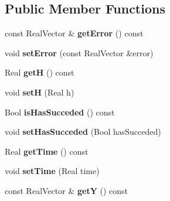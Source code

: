 \subsection*{Public Member Functions}
\begin{DoxyCompactItemize}
\item 
\hypertarget{classSingleRateBESolverData_af7c930c6aa2efb7860957e5044cc3373}{
const RealVector \& {\bfseries getError} () const }
\label{classSingleRateBESolverData_af7c930c6aa2efb7860957e5044cc3373}

\item 
\hypertarget{classSingleRateBESolverData_acb03ac3487e81e10ba857f496da0daaf}{
void {\bfseries setError} (const RealVector \&error)}
\label{classSingleRateBESolverData_acb03ac3487e81e10ba857f496da0daaf}

\item 
\hypertarget{classSingleRateBESolverData_a6db719022becc85e9419c8b6181b200a}{
Real {\bfseries getH} () const }
\label{classSingleRateBESolverData_a6db719022becc85e9419c8b6181b200a}

\item 
\hypertarget{classSingleRateBESolverData_aaef251e585ae5ab4b10b54bfe6076202}{
void {\bfseries setH} (Real h)}
\label{classSingleRateBESolverData_aaef251e585ae5ab4b10b54bfe6076202}

\item 
\hypertarget{classSingleRateBESolverData_a8a7382d33dff89c95be07a32749157d2}{
Bool {\bfseries isHasSucceded} () const }
\label{classSingleRateBESolverData_a8a7382d33dff89c95be07a32749157d2}

\item 
\hypertarget{classSingleRateBESolverData_aee4f7e6c1851c21dda37fae5f5ffb032}{
void {\bfseries setHasSucceded} (Bool hasSucceded)}
\label{classSingleRateBESolverData_aee4f7e6c1851c21dda37fae5f5ffb032}

\item 
\hypertarget{classSingleRateBESolverData_a932176df7eb8fb4a42e99e596555b9cd}{
Real {\bfseries getTime} () const }
\label{classSingleRateBESolverData_a932176df7eb8fb4a42e99e596555b9cd}

\item 
\hypertarget{classSingleRateBESolverData_aabc5e847c66a78c20ef2f464d6c51d75}{
void {\bfseries setTime} (Real time)}
\label{classSingleRateBESolverData_aabc5e847c66a78c20ef2f464d6c51d75}

\item 
\hypertarget{classSingleRateBESolverData_ae210703564ebc8670b0c68ea9e302245}{
const RealVector \& {\bfseries getY} () const }
\label{classSingleRateBESolverData_ae210703564ebc8670b0c68ea9e302245}


\end{DoxyCompactItemize}
